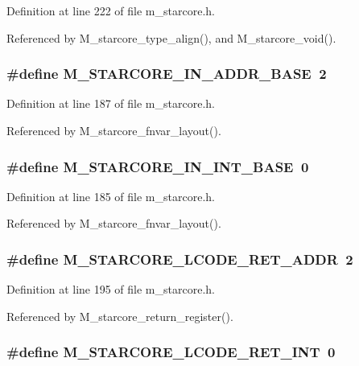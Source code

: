 Definition at line 222 of file m\_\-starcore.h.

Referenced by M\_\-starcore\_\-type\_\-align(), and M\_\-starcore\_\-void().
\subsubsection{\setlength{\rightskip}{0pt plus 5cm}\#define M\_\-STARCORE\_\-IN\_\-ADDR\_\-BASE~2}\label{m__starcore_8h_942534d0e612b2d0e7c25f41d9797443}




Definition at line 187 of file m\_\-starcore.h.

Referenced by M\_\-starcore\_\-fnvar\_\-layout().
\subsubsection{\setlength{\rightskip}{0pt plus 5cm}\#define M\_\-STARCORE\_\-IN\_\-INT\_\-BASE~0}\label{m__starcore_8h_255ae6f1c256eca4307686804b0d3538}




Definition at line 185 of file m\_\-starcore.h.

Referenced by M\_\-starcore\_\-fnvar\_\-layout().
\subsubsection{\setlength{\rightskip}{0pt plus 5cm}\#define M\_\-STARCORE\_\-LCODE\_\-RET\_\-ADDR~2}\label{m__starcore_8h_73106a5f4d5af8546d8f1c3a94034309}




Definition at line 195 of file m\_\-starcore.h.

Referenced by M\_\-starcore\_\-return\_\-register().
\subsubsection{\setlength{\rightskip}{0pt plus 5cm}\#define M\_\-STARCORE\_\-LCODE\_\-RET\_\-INT~0}\label{m__starcore_8h_dc96520b6d9a7dfaa0e7dc2f54086744}




